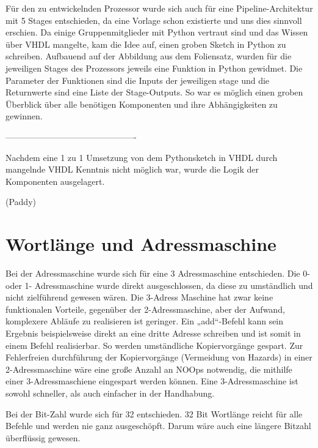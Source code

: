 \documentclass[paper=a4,fontsize=12pt,twocolumn]{scrreprt}
\begin{document}
Für den zu entwickelnden Prozessor wurde sich auch für eine Pipeline-Architektur mit 5 Stages entschieden, da eine Vorlage schon existierte und uns dies sinnvoll erschien.
Da einige Gruppenmitglieder mit Python vertraut sind und das Wissen über VHDL mangelte, kam die Idee auf, einen groben Sketch in Python zu schreiben.
Aufbauend auf der Abbildung aus dem Foliensatz, wurden für die jeweiligen Stages des Prozessors jeweils eine Funktion in Python gewidmet. %
Die Parameter der Funktionen sind die Inputs der jeweiligen stage und die Returnwerte sind eine Liste der Stage-Outputs.
So war es möglich einen groben Überblick über alle benötigen Komponenten und ihre Abhängigkeiten zu gewinnen.

----------------------------------------------

Nachdem eine 1 zu 1 Umsetzung von dem Pythonsketch in VHDL durch mangelnde VHDL Kenntnis nicht möglich war, wurde die Logik der Komponenten ausgelagert.


(Paddy)

\section{Wortlänge und Adressmaschine}


Bei der Adressmaschine wurde sich für eine 3 Adressmaschine entschieden.
Die 0- oder 1- Adressmaschine wurde direkt ausgeschlossen, da diese zu umständlich und nicht zielführend gewesen wären.
Die 3-Adress Maschine hat zwar keine funktionalen Vorteile, gegenüber der 2-Adressmaschine, aber der Aufwand, komplexere Abläufe zu realisieren ist geringer.
Ein „add“-Befehl kann sein Ergebnis beispielsweise direkt an eine dritte Adresse schreiben und ist somit in einem Befehl realisierbar.
So werden umständliche Kopiervorgänge gespart.
Zur Fehlerfreien durchführung der Kopiervorgänge (Vermeidung von Hazards) in einer 2-Adressmaschine wäre eine große Anzahl an NOOps notwendig, die mithilfe einer 3-Adressmaschiene eingespart werden können.
Eine 3-Adressmaschine ist sowohl schneller, als auch einfacher in der Handhabung.

Bei der Bit-Zahl wurde sich für 32 entschieden.
32 Bit Wortlänge reicht für alle Befehle und werden nie ganz ausgeschöpft.
Darum wäre auch eine längere Bitzahl überflüssig gewesen.

\end{document}
